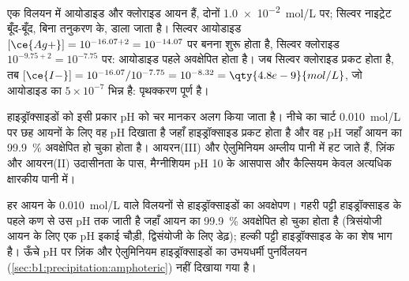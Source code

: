 \begin{example}[आयोडाइड और क्लोराइड]\label{ex:b1:precipitation:i-cl}
एक विलयन में आयोडाइड और क्लोराइड आयन हैं, दोनों
\qty{1.0e-2}{mol/L} पर; सिल्वर नाइट्रेट बूँद-बूँद, बिना
तनुकरण के, डाला जाता है। सिल्वर आयोडाइड $[\ce{Ag+}] = 10^{-16.07 + 2} =
10^{-14.07}$ पर बनना शुरू होता है, सिल्वर क्लोराइड $10^{-9.75 + 2} = 10^{-7.75}$ पर: आयोडाइड
पहले अवक्षेपित होता है। जब सिल्वर क्लोराइड प्रकट होता है, तब
$[\ce{I-}] = 10^{-16.07}/10^{-7.75} = 10^{-8.32} = \qty{4.8e-9}{mol/L}$,
जो आयोडाइड का $5 \times 10^{-7}$ भिन्न है: पृथक्करण पूर्ण है।
\end{example}

हाइड्रॉक्साइडों को इसी प्रकार pH को चर मानकर अलग किया जाता है।
नीचे का चार्ट \qty{0.010}{mol/L} पर छह आयनों के लिए
वह pH दिखाता है जहाँ हाइड्रॉक्साइड प्रकट होता है और वह pH जहाँ
आयन का \qty{99.9}{\percent} अवक्षेपित हो चुका होता है। आयरन(III) और ऐलुमिनियम
अम्लीय पानी में हट जाते हैं, ज़िंक और आयरन(II) उदासीनता के पास, मैग्नीशियम
pH 10 के आसपास और कैल्सियम केवल अत्यधिक क्षारकीय पानी में।

\begin{omfigure}

{\small हर आयन के \qty{0.010}{mol/L} वाले विलयनों से हाइड्रॉक्साइडों का
अवक्षेपण। गहरी पट्टी हाइड्रॉक्साइड के पहले कण से उस pH तक जाती है
जहाँ आयन का \qty{99.9}{\percent} अवक्षेपित हो चुका होता है (त्रिसंयोजी आयन के लिए
एक pH इकाई चौड़ी, द्विसंयोजी के लिए डेढ़); हल्की पट्टी हाइड्रॉक्साइड के
 का शेष भाग है। ऊँचे pH पर ज़िंक और ऐलुमिनियम हाइड्रॉक्साइडों का
उभयधर्मी पुनर्विलयन (\cref{sec:b1:precipitation:amphoteric}) नहीं दिखाया गया है।}
\end{omfigure}

